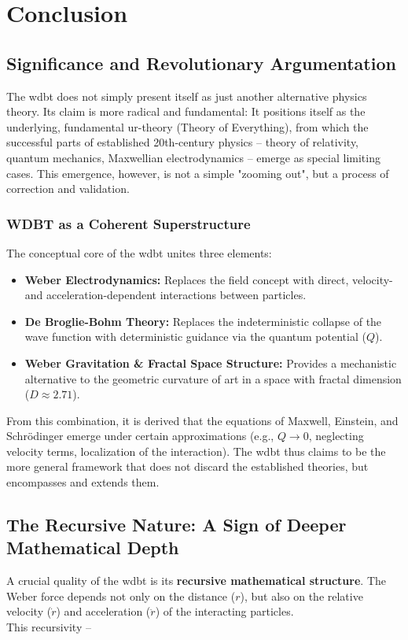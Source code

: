 \chapter{Conclusion}
\section{Significance and Revolutionary Argumentation}
The \gls{wdbt} does not simply present itself as just another alternative physics theory. Its claim is more radical and fundamental: It positions itself as the underlying, fundamental ur-theory (Theory of Everything), from which the successful parts of established 20th-century physics – theory of relativity, quantum mechanics, Maxwellian electrodynamics – emerge as special limiting cases. This emergence, however, is not a simple "zooming out", but a process of correction and validation.

\subsection{WDBT as a Coherent Superstructure}
The conceptual core of the \gls{wdbt} unites three elements:

\begin{itemize}
    \item \textbf{Weber Electrodynamics:} Replaces the field concept with direct, velocity- and acceleration-dependent interactions between particles.
    \item \textbf{De Broglie-Bohm Theory:} Replaces the indeterministic collapse of the wave function with deterministic guidance via the quantum potential ($Q$).
    \item \textbf{Weber Gravitation \& Fractal Space Structure:} Provides a mechanistic alternative to the geometric curvature of \gls{art} in a space with fractal dimension ($D \approx 2.71$).
\end{itemize}

From this combination, it is derived that the equations of Maxwell, Einstein, and Schrödinger emerge under certain approximations (e.g., $Q \to 0$, neglecting velocity terms, localization of the interaction). The \gls{wdbt} thus claims to be the more general framework that does not discard the established theories, but encompasses and extends them.

\section{The Recursive Nature: A Sign of Deeper Mathematical Depth}
A crucial quality of the \gls{wdbt} is its \textbf{recursive mathematical structure}. The Weber force depends not only on the distance ($r$), but also on the relative velocity ($\dot{r}$) and acceleration ($\ddot{r}$) of the interacting particles.\\This recursivity –

